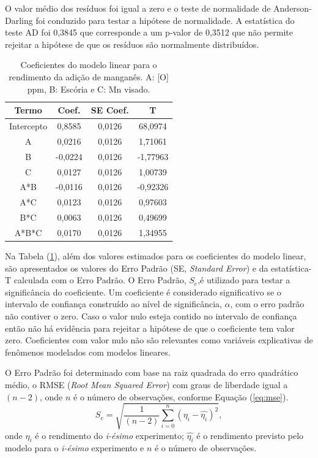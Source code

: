 		O valor médio dos resíduos foi igual a zero e o teste de normalidade de Anderson-Darling\cite{wiki:ad} foi conduzido para testar a hipótese de normalidade. A estatística do teste AD foi 0,3845 que corresponde a um p-valor de 0,3512 que não permite rejeitar a hipótese de que os resíduos são normalmente distribuídos.		
		\begin{table}[H]
			\caption{Coeficientes do modelo linear para o rendimento da adição de manganês. A: [O] ppm, B: Escória e C: Mn visado.}
			\label{tab:coef}
				\begin{center}
				\begin{footnotesize}
					\begin{tabular}{cccc}
						\hline
							Termo 		& Coef.   & SE Coef. & T \\
						\hline \hline
							Intercepto 	&  0,8585 & 0,0126 &  68,0974 \\
							A 			&  0,0216 & 0,0126 &  1,71061 \\
							B 			& -0,0224 & 0,0126 & -1,77963 \\
							C 			&  0,0127 & 0,0126 &  1,00739 \\
							A*B 		& -0,0116 & 0,0126 & -0,92326 \\
							A*C 		&  0,0123 & 0,0126 &  0,97603 \\
							B*C 		&  0,0063 & 0,0126 &  0,49699 \\
							A*B*C 		&  0,0170 & 0,0126 &  1,34955 \\						
						\hline
					\end{tabular}
				\end{footnotesize}
				\end{center}			
		\end{table}
		Na Tabela (\ref{tab:coef}), além dos valores estimados para os coeficientes do modelo linear, são apresentados os valores do Erro Padrão (SE, \textit{Standard Error}) e da estatística-T calculada com o Erro Padrão. O Erro Padrão, $S_e$,é utilizado para testar a significância do coeficiente. Um coeficiente é considerado significativo se o intervalo de confiança construído ao nível de significância, $\alpha$, com o erro padrão não contiver o zero. Caso o valor nulo esteja contido no intervalo de confiança então não há evidência para rejeitar a hipótese de que o coeficiente tem valor zero. Coeficientes com valor nulo não são relevantes como variáveis explicativas de fenômenos modelados com modelos lineares.
		
		O Erro Padrão foi determinado com base na raiz quadrada do erro quadrático médio, o RMSE (\textit{Root Mean Squared Error}) com graus de liberdade igual a $(n-2)$, onde $n$ é o número de observações, conforme Equação (\ref{eq:mse}).
		\begin{equation}
		\label{eq:mse}
		S_e = \sqrt{\frac{1}{(n-2)}  \sum_{i=0}^n \left( \eta_i - \hat{\eta_i} \right)^2},
		\end{equation}
		\noindent onde $\eta_i$ é o rendimento do \textit{i-ésimo} experimento; $\hat{\eta_i}$ é o rendimento previsto pelo modelo para o \textit{i-ésimo} experimento e $n$ é o número de observações.
		
